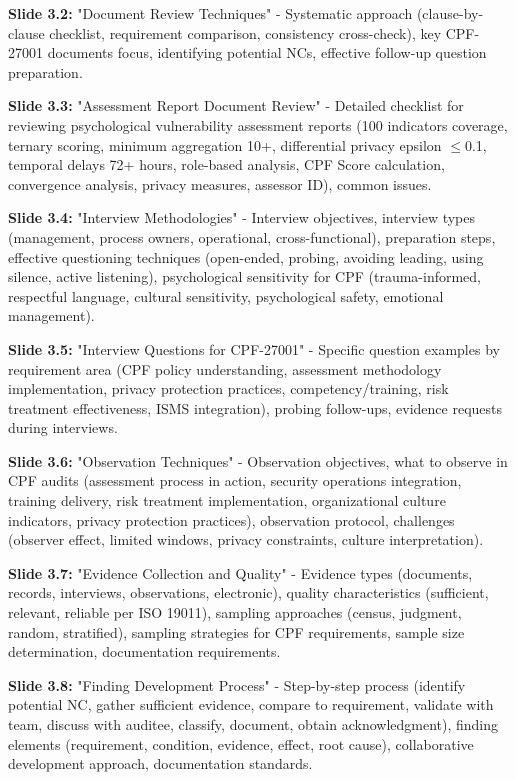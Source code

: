 \documentclass[11pt,a4paper]{article}
\begin{document}
\textbf{Slide 3.2:} "Document Review Techniques" - Systematic approach (clause-by-clause checklist, requirement comparison, consistency cross-check), key CPF-27001 documents focus, identifying potential NCs, effective follow-up question preparation.

\textbf{Slide 3.3:} "Assessment Report Document Review" - Detailed checklist for reviewing psychological vulnerability assessment reports (100 indicators coverage, ternary scoring, minimum aggregation 10+, differential privacy epsilon $\leq$0.1, temporal delays 72+ hours, role-based analysis, CPF Score calculation, convergence analysis, privacy measures, assessor ID), common issues.

\textbf{Slide 3.4:} "Interview Methodologies" - Interview objectives, interview types (management, process owners, operational, cross-functional), preparation steps, effective questioning techniques (open-ended, probing, avoiding leading, using silence, active listening), psychological sensitivity for CPF (trauma-informed, respectful language, cultural sensitivity, psychological safety, emotional management).

\textbf{Slide 3.5:} "Interview Questions for CPF-27001" - Specific question examples by requirement area (CPF policy understanding, assessment methodology implementation, privacy protection practices, competency/training, risk treatment effectiveness, ISMS integration), probing follow-ups, evidence requests during interviews.

\textbf{Slide 3.6:} "Observation Techniques" - Observation objectives, what to observe in CPF audits (assessment process in action, security operations integration, training delivery, risk treatment implementation, organizational culture indicators, privacy protection practices), observation protocol, challenges (observer effect, limited windows, privacy constraints, culture interpretation).

\textbf{Slide 3.7:} "Evidence Collection and Quality" - Evidence types (documents, records, interviews, observations, electronic), quality characteristics (sufficient, relevant, reliable per ISO 19011), sampling approaches (census, judgment, random, stratified), sampling strategies for CPF requirements, sample size determination, documentation requirements.

\textbf{Slide 3.8:} "Finding Development Process" - Step-by-step process (identify potential NC, gather sufficient evidence, compare to requirement, validate with team, discuss with auditee, classify, document, obtain acknowledgment), finding elements (requirement, condition, evidence, effect, root cause), collaborative development approach, documentation standards.
\end{document}

